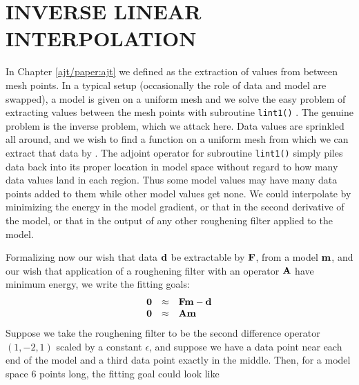 \section{INVERSE LINEAR INTERPOLATION}
In Chapter \ref{ajt/paper:ajt} we defined 
as the extraction of values from between mesh points.
In a typical setup (occasionally the role of data and model are swapped),
a model is given on a uniform mesh
and we solve the easy problem of extracting values
between the mesh points with subroutine \texttt{lint1()} .
The genuine problem is the inverse problem, which we attack here.
Data values are sprinkled all around,
and we wish to find a function on a uniform mesh
from which we can extract that data by .
The adjoint operator for subroutine {\tt lint1()}
simply piles data back into its proper location in model space
without regard to how many data values land in each region.
Thus some model values may have many data points added
to them while other model values get none.
We could interpolate by minimizing the energy in the model gradient,
or that in the second derivative of the model,
or that in the output of any other roughening filter
applied to the model.
\par
Formalizing now our wish
that data $\bold d$ be extractable by  $\bold F$,
from a model $\bold m$,
and our wish that application of a roughening filter
with an operator $\bold A$ have minimum energy, we write the fitting goals:
\begin{equation}
        \begin{array}{lll}
        \bold 0 &\approx & \bold F \bold m - \bold d \\
        \bold 0 &\approx & \bold A \bold m
        \label{eqn:invintwish}
        \end{array}
\end{equation}
Suppose we take the roughening filter to be the second difference operator
$(1,-2,1)$
scaled by a constant $\epsilon$,
and suppose we have a data point near each end of the model
and a third data point exactly in the middle.
Then,
for a model space 6 points long,
the fitting goal could look like
\def\E{\epsilon}
